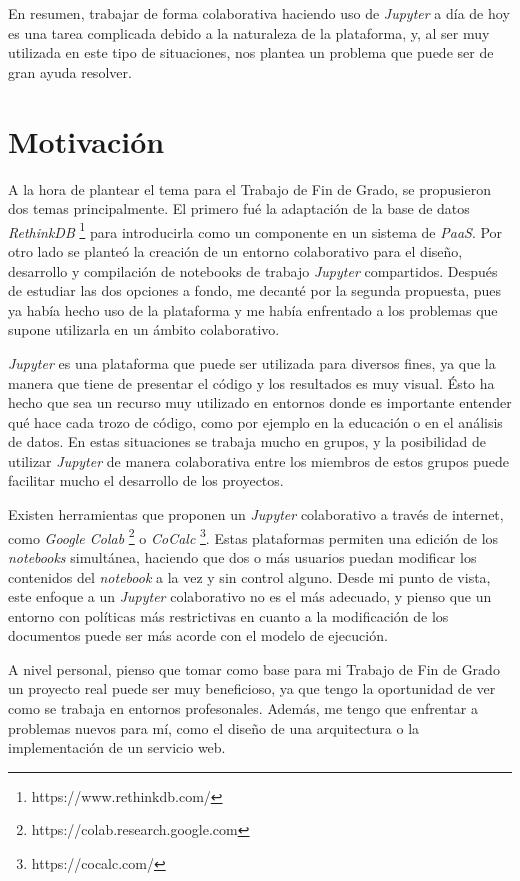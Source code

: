 \documentclass[11pt,spanish,listoffigures,listoftables]{tfgetsinf}
\begin{document}
En resumen, trabajar de forma colaborativa haciendo uso de \textit{Jupyter} a día de hoy es una tarea complicada debido a la naturaleza de la plataforma, y, al ser muy utilizada en este tipo de situaciones, nos plantea un problema que puede ser de gran ayuda resolver.



\section{Motivaci\'on}
\label{sec:motivacion}

A la hora de plantear el tema para el Trabajo de Fin de Grado, se propusieron dos temas principalmente. El primero fué la adaptación de la base de datos \textit{RethinkDB} \footnote{https://www.rethinkdb.com/} para introducirla como un componente en un sistema de \textit{PaaS}. Por otro lado se planteó la creación de un entorno colaborativo para el diseño, desarrollo y compilación de notebooks de trabajo \textit{Jupyter} compartidos. Después de estudiar las dos opciones a fondo, me decanté por la segunda propuesta, pues ya había hecho uso de la plataforma y me había enfrentado a los problemas que supone utilizarla en un ámbito colaborativo.

\textit{Jupyter} es una plataforma que puede ser utilizada para diversos fines, ya que la manera que tiene de presentar el código y los resultados es muy visual. Ésto ha hecho que sea un recurso muy utilizado en entornos donde es importante entender qué hace cada trozo de código, como por ejemplo en la educación o en el análisis de datos. En estas situaciones se trabaja mucho en grupos, y la posibilidad de utilizar \textit{Jupyter} de manera colaborativa entre los miembros de estos grupos puede facilitar mucho el desarrollo de los proyectos.

Existen herramientas que proponen un \textit{Jupyter} colaborativo a través de internet, como \textit{Google Colab} \footnote{https://colab.research.google.com} o \textit{CoCalc} \footnote{https://cocalc.com/}. Estas plataformas permiten una edición de los \textit{notebooks} simultánea, haciendo que dos o más usuarios puedan modificar los contenidos del \textit{notebook} a la vez y sin control alguno. Desde mi punto de vista, este enfoque a un \textit{Jupyter} colaborativo no es el más adecuado, y pienso que un entorno con políticas más restrictivas en cuanto a la modificación de los documentos puede ser más acorde con el modelo de ejecución.

A nivel personal, pienso que tomar como base para mi Trabajo de Fin de Grado un proyecto real puede ser muy beneficioso, ya que tengo la oportunidad de ver como se trabaja en entornos profesonales. Además, me tengo que enfrentar a problemas nuevos para mí, como el diseño de una arquitectura o la implementación de un servicio web. 
\end{document}
